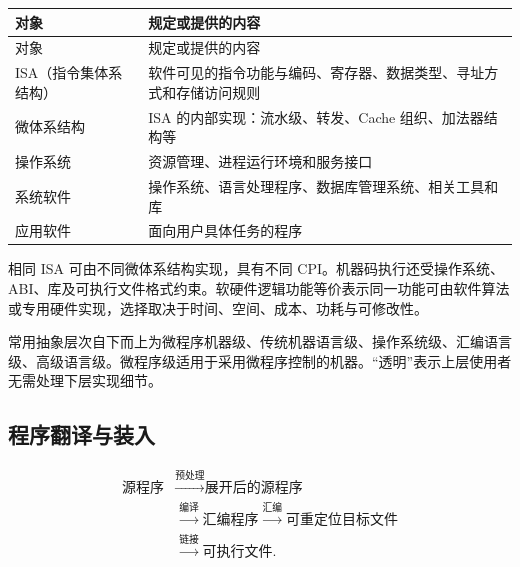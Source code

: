 \par\smallskip
\begin{wideblock}
{\fontsize{9.3}{12}\selectfont\setlength{\tabcolsep}{2.5pt}\setlength{\LTleft}{0pt}\setlength{\LTright}{0pt}
\begin{longtable}{@{}>{\raggedright\arraybackslash}p{}>{\raggedright\arraybackslash}p{}@{}}
\toprule
对象 & 规定或提供的内容 \\

\midrule\endfirsthead\toprule
对象 & 规定或提供的内容 \\

\midrule\endhead\bottomrule\endfoot
ISA（指令集体系结构） & 软件可见的指令功能与编码、寄存器、数据类型、寻址方式和存储访问规则 \\

微体系结构 & ISA 的内部实现：流水级、转发、Cache 组织、加法器结构等 \\

操作系统 & 资源管理、进程运行环境和服务接口 \\

系统软件 & 操作系统、语言处理程序、数据库管理系统、相关工具和库 \\

应用软件 & 面向用户具体任务的程序 \\

\end{longtable}}
\end{wideblock}
\par\smallskip

相同 ISA 可由不同微体系结构实现，具有不同 CPI。机器码执行还受操作系统、ABI、库及可执行文件格式约束。软硬件逻辑功能等价表示同一功能可由软件算法或专用硬件实现，选择取决于时间、空间、成本、功耗与可修改性。

常用抽象层次自下而上为微程序机器级、传统机器语言级、操作系统级、汇编语言级、高级语言级。微程序级适用于采用微程序控制的机器。``透明''表示上层使用者无需处理下层实现细节。

\subsection{程序翻译与装入}\label{CO01-translation}

\[\begin{aligned}
\text{源程序}&\xrightarrow{\text{预处理}}\text{展开后的源程序}\\
&\xrightarrow{\text{编译}}\text{汇编程序}\xrightarrow{\text{汇编}}\text{可重定位目标文件}\\
&\xrightarrow{\text{链接}}\text{可执行文件}.
\end{aligned}\]

